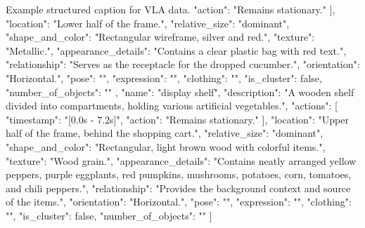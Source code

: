 \begin{captionexample}{Example structured caption for VLA data.}
{{{          "action": "Remains stationary."
        }
      ],
      "location": "Lower half of the frame.",
      "relative_size": "dominant",
      "shape_and_color": "Rectangular wireframe, silver and red.",
      "texture": "Metallic.",
      "appearance_details": "Contains a clear plastic bag with red text.",
      "relationship": "Serves as the receptacle for the dropped cucumber.",
      "orientation": "Horizontal.",
      "pose": "",
      "expression": "",
      "clothing": "",
      "is_cluster": false,
      "number_of_objects": ""
    },
    {
      "name": "display shelf",
      "description": "A wooden shelf divided into compartments, holding various artificial vegetables.",
      "actions": [
        {
          "timestamp": "[0.0s - 7.2s]",
          "action": "Remains stationary."
        }
      ],
      "location": "Upper half of the frame, behind the shopping cart.",
      "relative_size": "dominant",
      "shape_and_color": "Rectangular, light brown wood with colorful items.",
      "texture": "Wood grain.",
      "appearance_details": "Contains neatly arranged yellow peppers, purple eggplants, red pumpkins, mushrooms, potatoes, corn, tomatoes, and chili peppers.",
      "relationship": "Provides the background context and source of the items.",
      "orientation": "Horizontal.",
      "pose": "",
      "expression": "",
      "clothing": "",
      "is_cluster": false,
      "number_of_objects": ""
    }
  ]
}
\end{captionexample}

